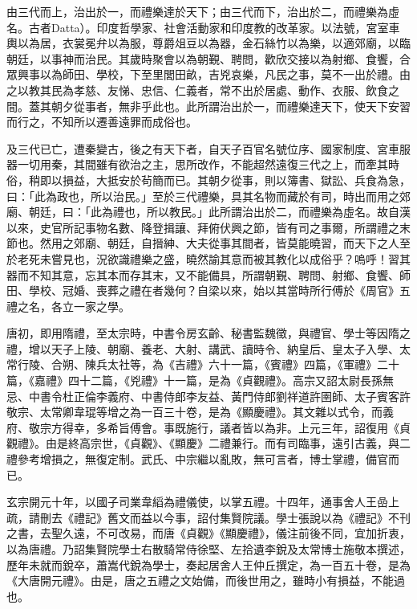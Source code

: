 
\begin{pinyinscope}

 由三代而上，治出於一，而禮樂達於天下；由三代而下，治出於二，而禮樂為虛名。古者Datta）。印度哲學家、社會活動家和印度教的改革家。以法號，宮室車輿以為居，衣裳冕弁以為服，尊爵俎豆以為器，金石絲竹以為樂，以適郊廟，以臨朝廷，以事神而治民。其歲時聚會以為朝覲、聘問，歡欣交接以為射鄉、食饗，合眾興事以為師田、學校，下至里閭田畝，吉兇哀樂，凡民之事，莫不一出於禮。由之以教其民為孝慈、友悌、忠信、仁義者，常不出於居處、動作、衣服、飲食之間。蓋其朝夕從事者，無非乎此也。此所謂治出於一，而禮樂達天下，使天下安習而行之，不知所以遷善遠罪而成俗也。



 及三代已亡，遭秦變古，後之有天下者，自天子百官名號位序、國家制度、宮車服器一切用秦，其間雖有欲治之主，思所改作，不能超然遠復三代之上，而牽其時俗，稍即以損益，大抵安於茍簡而已。其朝夕從事，則以簿書、獄訟、兵食為急，曰：「此為政也，所以治民。」至於三代禮樂，具其名物而藏於有司，時出而用之郊廟、朝廷，曰：「此為禮也，所以教民。」此所謂治出於二，而禮樂為虛名。故自漢以來，史官所記事物名數、降登揖讓、拜俯伏興之節，皆有司之事爾，所謂禮之末節也。然用之郊廟、朝廷，自搢紳、大夫從事其間者，皆莫能曉習，而天下之人至於老死未嘗見也，況欲識禮樂之盛，曉然諭其意而被其教化以成俗乎？嗚呼！習其器而不知其意，忘其本而存其末，又不能備具，所謂朝覲、聘問、射鄉、食饗、師田、學校、冠婚、喪葬之禮在者幾何？自梁以來，始以其當時所行傅於《周官》五禮之名，各立一家之學。



 唐初，即用隋禮，至太宗時，中書令房玄齡、秘書監魏徵，與禮官、學士等因隋之禮，增以天子上陵、朝廟、養老、大射、講武、讀時令、納皇后、皇太子入學、太常行陵、合朔、陳兵太社等，為《吉禮》六十一篇，《賓禮》四篇，《軍禮》二十篇，《嘉禮》四十二篇，《兇禮》十一篇，是為《貞觀禮》。高宗又詔太尉長孫無忌、中書令杜正倫李義府、中書侍郎李友益、黃門侍郎劉祥道許圉師、太子賓客許敬宗、太常卿韋琨等增之為一百三十卷，是為《顯慶禮》。其文雜以式令，而義府、敬宗方得幸，多希旨傅會。事既施行，議者皆以為非。上元三年，詔復用《貞觀禮》。由是終高宗世，《貞觀》、《顯慶》二禮兼行。而有司臨事，遠引古義，與二禮參考增損之，無復定制。武氏、中宗繼以亂敗，無可言者，博士掌禮，備官而已。



 玄宗開元十年，以國子司業韋縚為禮儀使，以掌五禮。十四年，通事舍人王嵒上疏，請刪去《禮記》舊文而益以今事，詔付集賢院議。學士張說以為《禮記》不刊之書，去聖久遠，不可改易，而唐《貞觀》《顯慶禮》，儀注前後不同，宜加折衷，以為唐禮。乃詔集賢院學士右散騎常侍徐堅、左拾遺李銳及太常博士施敬本撰述，歷年未就而銳卒，蕭嵩代銳為學士，奏起居舍人王仲丘撰定，為一百五十卷，是為《大唐開元禮》。由是，唐之五禮之文始備，而後世用之，雖時小有損益，不能過也。




\end{pinyinscope}
